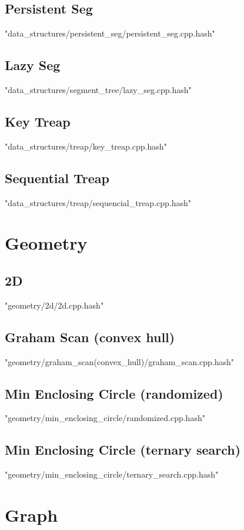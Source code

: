 \documentclass [12pt,onecolumn,oneside]{article}
\begin{document}
\subsection{ Persistent Seg}
 {"data_structures/persistent_seg/persistent_seg.cpp.hash"}
\subsection{ Lazy Seg}
 {"data_structures/segment_tree/lazy_seg.cpp.hash"}
\subsection{ Key Treap}
 {"data_structures/treap/key_treap.cpp.hash"}
\subsection{ Sequential Treap}
 {"data_structures/treap/sequencial_treap.cpp.hash"}
\newpage

\section{Geometry}
\subsection{ 2D}
 {"geometry/2d/2d.cpp.hash"}
\subsection{ Graham Scan (convex hull)}
 {"geometry/graham_scan(convex_hull)/graham_scan.cpp.hash"}
\subsection{ Min Enclosing Circle (randomized)}
 {"geometry/min_enclosing_circle/randomized.cpp.hash"}
\subsection{ Min Enclosing Circle (ternary search)}
 {"geometry/min_enclosing_circle/ternary_search.cpp.hash"}
\newpage

\section{Graph}
\end{document}
